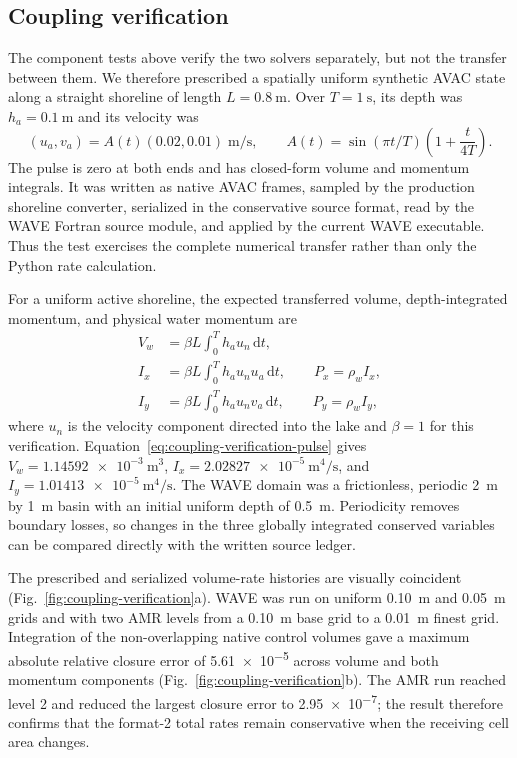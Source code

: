 \documentclass[11pt,a4paper]{article}
\begin{document}
\subsection{Coupling verification}
\label{sec:coupling-verification}

The component tests above verify the two solvers separately, but not the
transfer between them.  We therefore prescribed a spatially uniform synthetic
AVAC state along a straight shoreline of length $L=\SI{0.8}{\metre}$.  Over
$T=\SI{1}{\second}$, its depth was $h_a=\SI{0.1}{\metre}$ and its velocity
was
\begin{equation}
  (u_a,v_a)=A(t)(0.02,0.01)\;\si{\metre\per\second}, \qquad
  A(t)=\sin(\pi t/T)\left(1+\frac{t}{4T}\right).
  \label{eq:coupling-verification-pulse}
\end{equation}
The pulse is zero at both ends and has closed-form volume and momentum
integrals.  It was written as native AVAC frames, sampled by the production
shoreline converter, serialized in the conservative source format, read by
the WAVE Fortran source module, and applied by the current WAVE executable.
Thus the test exercises the complete numerical transfer rather than only the
Python rate calculation.

For a uniform active shoreline, the expected transferred volume,
depth-integrated momentum, and physical water momentum are
\begin{align}
  V_w &= \beta L\int_0^T h_a u_n\,\mathrm{d}t, \\
  I_x &= \beta L\int_0^T h_a u_n u_a\,\mathrm{d}t, \qquad P_x=\rho_w I_x, \\
  I_y &= \beta L\int_0^T h_a u_n v_a\,\mathrm{d}t, \qquad P_y=\rho_w I_y,
  \label{eq:coupling-verification-ledger}
\end{align}
where $u_n$ is the velocity component directed into the lake and $\beta=1$
for this verification.  Equation~\eqref{eq:coupling-verification-pulse} gives
$V_w=\SI{1.14592e-3}{\metre\cubed}$,
$I_x=\SI{2.02827e-5}{\metre\tothe{4}\per\second}$, and
$I_y=\SI{1.01413e-5}{\metre\tothe{4}\per\second}$.  The WAVE domain was a
frictionless, periodic \SI{2}{\metre} by \SI{1}{\metre} basin with an
initial uniform depth of \SI{0.5}{\metre}.  Periodicity removes boundary
losses, so changes in the three globally integrated conserved variables can
be compared directly with the written source ledger.

The prescribed and serialized volume-rate histories are visually coincident
(Fig.~\ref{fig:coupling-verification}a).  WAVE was run on uniform
\SI{0.10}{\metre} and \SI{0.05}{\metre} grids and with two AMR levels from a
\SI{0.10}{\metre} base grid to a \SI{0.01}{\metre} finest grid.  Integration
of the non-overlapping native control volumes gave a maximum absolute relative
closure error of \num{5.61e-5} across volume and both momentum components
(Fig.~\ref{fig:coupling-verification}b).  The AMR run reached level 2 and
reduced the largest closure error to \num{2.95e-7}; the result therefore
confirms that the format-2 total rates remain conservative when the receiving
cell area changes.
\end{document}
